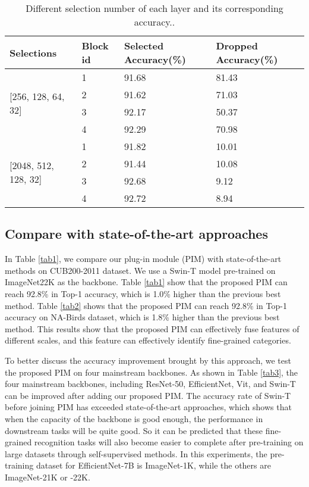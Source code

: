 \documentclass[conference]{IEEEtran}
\begin{document}
\begin{table}[!tp]
\caption{Different selection number of each layer and its corresponding accuracy..}
\begin{center}
\begin{tabular}{|p{5em}|p{3em}|p{6em}|p{6em}|}
\hline
\hline
Selections & Block id & Selected Accuracy(\%) & Dropped   Accuracy(\%) \\
\hline
\hline
\multirow{4}{5em}{[256, 128, 64, 32]} &  1 & 91.68 & 81.43 \\ \cline{2-4} 
                       &  2 & 91.62 & 71.03 \\ \cline{2-4} 
                       &  3 & 92.17 & 50.37 \\ \cline{2-4} 
                       &  4 & 92.29 & 70.98 \\
\hline
\hline
\multirow{4}{5em}{[2048, 512, 128, 32]} &  1 & 91.82 & 10.01 \\ \cline{2-4} 
                       &  2 & 91.44 & 10.08 \\ \cline{2-4} 
                       &  3 & 92.68 & 9.12 \\ \cline{2-4} 
                       &  4 & 92.72 & 8.94 \\
\hline
\hline
\end{tabular}
\label{tab6}
\end{center}
\end{table}

\subsection{Compare with state-of-the-art approaches}

In Table \ref{tab1}, we compare our plug-in module (PIM) with state-of-the-art methods on CUB200-2011 dataset. We use a Swin-T model pre-trained on ImageNet22K as the backbone. Table \ref{tab1} show that the proposed PIM  can reach 92.8\% in Top-1 accuracy, which is 1.0\% higher than the previous best method. Table \ref{tab2} shows that the proposed PIM can reach 92.8\% in Top-1 accuracy on NA-Birds dataset, which is 1.8\% higher than the previous best method. This results show that the proposed PIM can effectively fuse features of different scales, and this feature can effectively identify fine-grained categories.

To better discuss the accuracy improvement brought by this approach, we test the proposed PIM on four mainstream backbones. As shown in Table \ref{tab3}, the four mainstream backbones, including ResNet-50\cite{ResNet}, EfficientNet\cite{EfficientNet}, Vit\cite{ViT}, and Swin-T\cite{Swin_T} can be improved after adding our proposed PIM. The accuracy rate of Swin-T before joining PIM has exceeded state-of-the-art approaches, which shows that when the capacity of the backbone is good enough, the performance in downstream tasks will be quite good. So it can be predicted that these fine-grained recognition tasks will also become easier to complete after pre-training on large datasets through self-supervised methods. In this experiments, the pre-training dataset for EfficientNet-7B is ImageNet-1K, while the others are ImageNet-21K or -22K.
\end{document}
